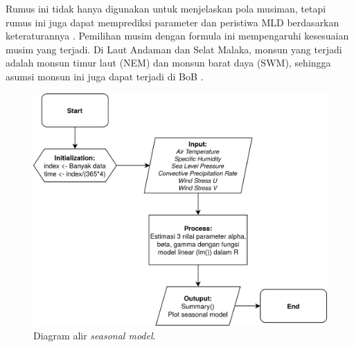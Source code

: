 \begin{spacing}{1.5}
	Rumus ini tidak hanya digunakan untuk menjelaskan pola musiman, tetapi rumus ini juga dapat memprediksi parameter dan peristiwa MLD berdasarkan keteraturannya . Pemilihan musim dengan formula ini mempengaruhi kesesuaian musim yang terjadi. Di Laut Andaman dan Selat Malaka, monsun yang terjadi adalah monsun timur laut (NEM) dan monsun barat daya (SWM), sehingga asumsi monsun ini juga dapat terjadi di BoB .
	\begin{figure}[H]
		\centering
		\includegraphics[width=12cm]{contents/Flowchart_2.png}
		\caption{Diagram alir \textit{seasonal model}.}
		\label{fig:flowchart_2}
	\end{figure}

\end{spacing}
